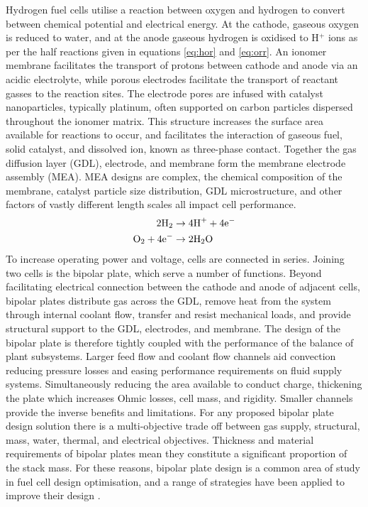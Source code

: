 Hydrogen fuel cells utilise a reaction between oxygen and hydrogen to convert between chemical potential and electrical energy.
At the cathode, gaseous oxygen is reduced to water, and at the anode gaseous hydrogen is oxidised to H$^+$ ions as per the half reactions given in equations \ref{eq:hor} and \ref{eq:orr}.
An ionomer membrane facilitates the transport of protons between cathode and anode via an acidic electrolyte, while porous electrodes facilitate the transport of reactant gasses to the reaction sites.
The electrode pores are infused with catalyst nanoparticles, typically platinum, often supported on carbon particles dispersed throughout the ionomer matrix.
This structure increases the surface area available for reactions to occur, and facilitates the interaction of gaseous fuel, solid catalyst, and dissolved ion, known as three-phase contact.
Together the gas diffusion layer (GDL), electrode, and membrane form the membrane electrode assembly (MEA).
MEA designs are complex, the chemical composition of the membrane, catalyst particle size distribution, GDL microstructure, and other factors of vastly different length scales all impact cell performance.
\begin{align}
	2\text{H}_2             & \rightarrow 4 \text{H}^+ + 4 \text{e}^- \label{eq:hor} \\
	\text{O}_2 + 4\text{e}^- & \rightarrow 2\text{H}_2\text{O} \label{eq:orr}
\end{align}
To increase operating power and voltage, cells are connected in series.
Joining two cells is the bipolar plate, which serve a number of functions.
Beyond facilitating electrical connection between the cathode and anode of adjacent cells, bipolar plates distribute gas across the GDL, remove heat from the system through internal coolant flow, transfer and resist mechanical loads, and provide structural support to the GDL, electrodes, and membrane.
The design of the bipolar plate is therefore tightly coupled with the performance of the balance of plant subsystems.
Larger feed flow and coolant flow channels aid convection reducing pressure losses and easing performance requirements on fluid supply systems.
Simultaneously reducing the area available to conduct charge, thickening the plate which increases Ohmic losses, cell mass, and rigidity.
Smaller channels provide the inverse benefits and limitations.
For any proposed bipolar plate design solution there is a multi-objective trade off between gas supply, structural, mass, water, thermal, and electrical objectives.
Thickness and material requirements of bipolar plates mean they constitute a significant proportion of the stack mass.
For these reasons, bipolar plate design is a common area of study in fuel cell design optimisation, and a range of strategies have been applied to improve their design \cite{liReviewBipolarPlates2005}.

